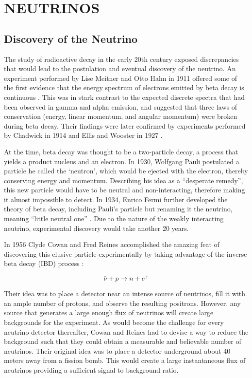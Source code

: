 \chapter{\uppercase{Neutrinos}} \label{ch:Neutrinos}

\section{Discovery of the Neutrino} \label{sec:NeutrinoDiscovery}

The study of radioactive decay in the early 20th century exposed discrepancies that would lead to the postulation and eventual discovery of the neutrino.
An experiment performed by Lise Meitner and Otto Hahn in 1911 offered some of the first evidence that the energy spectrum of electrons emitted by beta decay is continuous \cite{Hahn:1911}. 
This was in stark contrast to the expected discrete spectra that had been observed in gamma and alpha emission, and suggested that three laws of conservation (energy, linear momentum, and angular momentum) were broken during beta decay. 
Their findings were later confirmed by experiments performed by Chadwick in 1914 \cite{Chadwick:1914zz} and Ellis and Wooster in 1927 \cite{Ellis:1927}. 

At the time, beta decay was thought to be a two-particle decay, a process that yields a product nucleus and an electron.
In 1930, Wolfgang Pauli postulated a particle he called the `neutron', which would be ejected with the electron, thereby conserving energy and momentum.
Describing his idea as a ``desperate remedy'', this new particle would have to be neutral and non-interacting, therefore making it almost impossible to detect.
In 1934, Enrico Fermi further developed the theory of beta decay, including Pauli's particle but renaming it the neutrino, meaning ``little neutral one'' \cite{Fermi:1934hr}.
Due to the nature of the weakly interacting neutrino, experimental discovery would take another 20 years.

In 1956 Clyde Cowan and Fred Reines accomplished the amazing feat of discovering this elusive particle experimentally by taking advantage of the inverse beta decay (IBD) process \cite{Cowan}:

\begin{equation}
	\bar{\nu} + p \rightarrow n + e^{+}
\end{equation}

Their idea was to place a detector near an intense source of neutrinos, fill it with an ample number of protons, and observe the resulting positrons. 
However, any source that generates a large enough flux of neutrinos will create large backgrounds for the experiment. 
As would become the challenge for every neutrino detector thereafter, Cowan and Reines had to devise a way to reduce the background such that they could obtain a measurable and believable number of neutrinos.
Their original idea was to place a detector underground about 40 meters away from a fission bomb. 
This would create a large instantaneous flux of neutrinos providing a sufficient signal to background ratio. 

